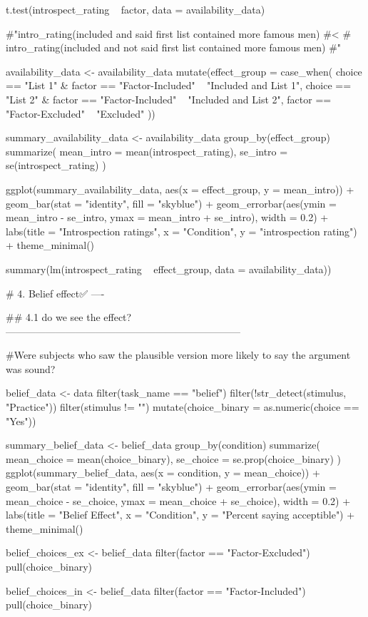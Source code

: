 \documentclass{article}
\begin{document}
t.test(introspect_rating ~ factor, data = availability_data)

#"intro_rating(included and said first list contained more famous men)
#<
#  intro_rating(included and not said first list contained more famous men)
#"

availability_data <- availability_data %
  mutate(effect_group = case_when(
    choice == "List 1" & factor == "Factor-Included" ~ "Included and List 1",
    choice == "List 2" & factor == "Factor-Included" ~ "Included and List 2",
    factor == "Factor-Excluded" ~ "Excluded"
  ))

summary_availability_data <- availability_data %
  group_by(effect_group) %
  summarize(
    mean_intro = mean(introspect_rating),
    se_intro = se(introspect_rating)
  )

ggplot(summary_availability_data, aes(x = effect_group, y = mean_intro)) +
  geom_bar(stat = "identity", fill = "skyblue") +
  geom_errorbar(aes(ymin = mean_intro - se_intro, ymax = mean_intro + se_intro), width = 0.2) +
  labs(title = "Introspection ratings", x = "Condition", y = "introspection rating") +
  theme_minimal()

summary(lm(introspect_rating ~ effect_group, data = availability_data))



# 4. Belief effect✅  ----

    ## 4.1 do we see the effect? -----------------------------------------------------------------------

#Were subjects who saw the plausible version more likely to say the argument was sound?


belief_data <- data %
  filter(task_name == "belief") %
  filter(!str_detect(stimulus, "Practice")) %
  filter(stimulus != "") %
  mutate(choice_binary = as.numeric(choice == "Yes"))

summary_belief_data <- belief_data %
  group_by(condition) %
  summarize(
    mean_choice = mean(choice_binary),
    se_choice = se.prop(choice_binary)
  )
ggplot(summary_belief_data, aes(x = condition, y = mean_choice)) +
  geom_bar(stat = "identity", fill = "skyblue") +
  geom_errorbar(aes(ymin = mean_choice - se_choice, ymax = mean_choice + se_choice), width = 0.2) +
  labs(title = "Belief Effect", x = "Condition", y = "Percent saying acceptible") +
  theme_minimal()

belief_choices_ex <- belief_data %
  filter(factor == "Factor-Excluded") %
  pull(choice_binary)

belief_choices_in <- belief_data %
  filter(factor == "Factor-Included") %
  pull(choice_binary)
\end{document}
